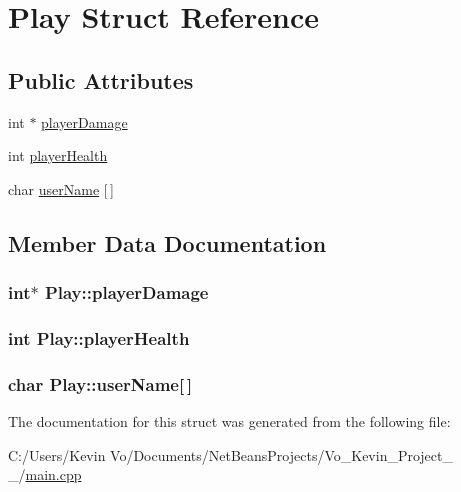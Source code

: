 \hypertarget{struct_play}{\section{Play Struct Reference}
\label{struct_play}
}
\subsection*{Public Attributes}
\begin{DoxyCompactItemize}
\item 
int $\ast$ \hyperlink{struct_play_ac937f89a2cff0d973be6a7996d327d69}{player\+Damage}
\item 
int \hyperlink{struct_play_acd4b4302358063ac72cb35f970096a5a}{player\+Health}
\item 
char \hyperlink{struct_play_a4d9060044c087e729eaf90363683a136}{user\+Name} \mbox{[}$\,$\mbox{]}
\end{DoxyCompactItemize}


\subsection{Member Data Documentation}
\hypertarget{struct_play_ac937f89a2cff0d973be6a7996d327d69}{
\subsubsection[{player\+Damage}]{\setlength{\rightskip}{0pt plus 5cm}int$\ast$ Play\+::player\+Damage}}\label{struct_play_ac937f89a2cff0d973be6a7996d327d69}
\hypertarget{struct_play_acd4b4302358063ac72cb35f970096a5a}{
\subsubsection[{player\+Health}]{\setlength{\rightskip}{0pt plus 5cm}int Play\+::player\+Health}}\label{struct_play_acd4b4302358063ac72cb35f970096a5a}
\hypertarget{struct_play_a4d9060044c087e729eaf90363683a136}{
\subsubsection[{user\+Name}]{\setlength{\rightskip}{0pt plus 5cm}char Play\+::user\+Name\mbox{[}$\,$\mbox{]}}}\label{struct_play_a4d9060044c087e729eaf90363683a136}


The documentation for this struct was generated from the following file\+:\begin{DoxyCompactItemize}
\item 
C\+:/\+Users/\+Kevin Vo/\+Documents/\+Net\+Beans\+Projects/\+Vo\+\_\+\+Kevin\+\_\+\+Project\+\_ \+\_/\hyperlink{main_8cpp}{main.\+cpp}\end{DoxyCompactItemize}
